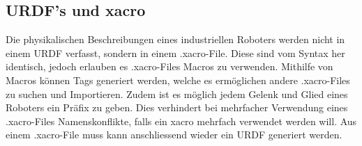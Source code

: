 \subsection{URDF's und xacro}
Die physikalischen Beschreibungen eines industriellen Roboters werden nicht in einem URDF verfasst, sondern in einem .xacro-File. Diese sind vom Syntax her identisch, jedoch erlauben es .xacro-Files Macros zu verwenden. Mithilfe von Macros können Tags generiert werden, welche es ermöglichen andere .xacro-Files zu suchen und Importieren. Zudem ist es möglich jedem Gelenk und Glied eines Roboters ein Präfix zu geben. Dies verhindert bei mehrfacher Verwendung eines .xacro-Files Namenskonflikte, falls ein xacro mehrfach verwendet werden will.
Aus einem .xacro-File muss kann anschliessend wieder ein URDF generiert werden. 
